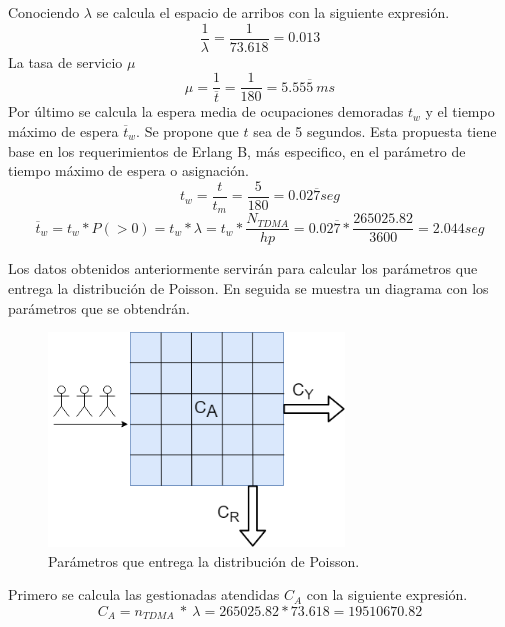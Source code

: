 \documentclass[11pt,letterpaper]{article}
\begin{document}
Conociendo $\lambda$ se calcula el espacio de arribos con la siguiente expresión.
\begin{equation}
    \frac{1}{\lambda}=\frac{1}{73.618}=0.013 
\end{equation}
La tasa de servicio $\mu$
\begin{equation}
    \mu=\frac{1}{\overline{t}}=\frac{1}{180}=5.55\overline{5} \ ms
\end{equation}
Por último se calcula la espera media de ocupaciones demoradas $t_w$ y el tiempo máximo 
de espera $\overline{t}_w$. Se propone que $t$ sea de 5 segundos. Esta propuesta tiene base en los 
requerimientos de Erlang B, más especifico, en el parámetro de tiempo máximo de espera o 
asignación. 
\begin{equation}
    t_w=\frac{t}{t_m}=\frac{5}{180}=0.02\overline{7} seg
\end{equation}
\begin{equation}
    \overline{t}_w=t_w*P(>0)=t_w*\lambda=t_w*\frac{N_{TDMA}}{hp}=0.02\overline{7}*\frac{265025.82}{3600}=2.044seg
\end{equation}

Los datos obtenidos anteriormente servirán para calcular los parámetros que entrega 
la distribución de Poisson. En seguida se muestra un diagrama con los parámetros que se 
obtendrán.

\begin{figure}[ht]
    \centering
    \includegraphics[width=0.7\textwidth]{imagenes/t34.png}
    \caption{Parámetros que entrega la distribución de Poisson.}
\end{figure}

Primero se calcula las gestionadas atendidas $C_{A}$ con la siguiente expresión.
\begin{equation}
    C_A=n_{TDMA} \ * \ \lambda = 265025.82 * 73.618=19510670.82
\end{equation}
\end{document}
